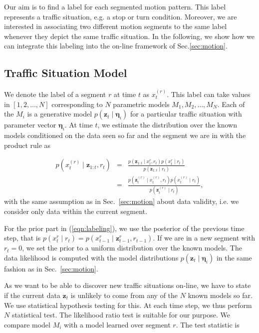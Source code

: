 Our aim is to find a label for each segmented motion pattern. This
label represents a traffic situation, e.g. a stop or turn condition.
Moreover, we are interested in associating two different motion
segments to the same label whenever they depict the same traffic
situation. In the following, we show how we can integrate this
labeling into the on-line framework of Sec.\ref{sec:motion}.

\subsection{Traffic Situation Model}
We denote the label of a segment $r$ at time $t$ as $x_t^{(r)}$. This
label can take values in $[1,2,\dots,N]$ corresponding to $N$
parametric models $M_1,M_2,\dots,M_N$. Each of the $M_i$ is a
generative model $p(\mathbf{z}_t\mid\boldsymbol{\eta}_i)$ for a
particular traffic situation with parameter vector
$\boldsymbol{\eta}_i$. At time $t$, we estimate the distribution over
the known models conditioned on the data seen so far and the segment
we are in with the product rule as

\begin{eqnarray}
\label{eqn:labeling}
p(x_t^{(r)}\mid \mathbf{z}_{1:t},r_t) &=& \frac{p(\mathbf{z}_{1:t}\mid x_t^r,r_t)p(x_t^r\mid r_t)}
  {p(\mathbf{z}_{1:t}\mid r_t)}\nonumber\\
                         &=& \frac{p(\mathbf{z}_t^{(r)}\mid x_t^{(r)},r_t)p(x_t^{(r)}\mid r_t)}
  {p(\mathbf{z}_t^{(r)}\mid r_t)},
\end{eqnarray}
with the same assumption as in Sec.~\ref{sec:motion} about data
validity, i.e. we consider only data within the current segment.

For the prior part in (\ref{eqn:labeling}), we use the posterior of the previous
time step, that is
$p(x_t^r\mid r_t)=p(x_{t-1}^r\mid \mathbf{z}_{t-1}^r,r_{t-1})$. If we are in a new
segment with $r_t=0$, we set the prior to a uniform distribution over the known
models. The data likelihood is computed with the model distributions
$p(\mathbf{z}_t\mid \boldsymbol{\eta}_i)$ in the same fashion as in Sec.~\ref{sec:motion}.

As we want to be able to discover new traffic situations on-line, we
have to state if the current data $\mathbf{z}_t$ is unlikely to come
from any of the $N$ known models so far. We use statistical hypothesis
testing for this. At each time step, we thus perform $N$ statistical
test. The likelihood ratio test is suitable for our purpose. We
compare model $M_i$ with a model learned over segment $r$. The test
statistic is

